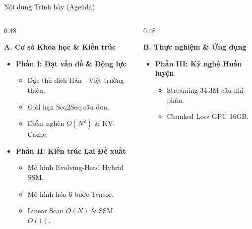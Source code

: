 \documentclass[aspectratio=169, 10pt]{beamer}
\begin{document}
\begin{frame}{Nội dung Trình bày (Agenda)}
  \begin{columns}[t]
    \begin{column}{0.48\textwidth}
      \begin{block}{\textbf{A. Cơ sở Khoa học \& Kiến trúc}}
        \footnotesize
        \begin{itemize}
          \setlength{\itemsep}{0.15cm}
          \item \textbf{Phần I: Đặt vấn đề \& Động lực}
            \begin{itemize}
              \footnotesize
              \item Đặc thù dịch Hán - Việt trường thiên.
              \item Giới hạn Seq2Seq câu đơn.
              \item Điểm nghẽn $O(N^2)$ \& KV-Cache.
            \end{itemize}
          \item \textbf{Phần II: Kiến trúc Lai Đề xuất}
            \begin{itemize}
              \footnotesize
              \item Mô hình Evolving-Head Hybrid SSM.
              \item Mô hình hóa 6 bước Tensor.
              \item Linear Scan $O(N)$ \& SSM $O(1)$.
            \end{itemize}
        \end{itemize}
      \end{block}
    \end{column}
    \begin{column}{0.48\textwidth}
      \begin{block}{\textbf{B. Thực nghiệm \& Ứng dụng}}
        \footnotesize
        \begin{itemize}
          \setlength{\itemsep}{0.15cm}
          \item \textbf{Phần III: Kỹ nghệ Huấn luyện}
            \begin{itemize}
              \footnotesize
              \item Streaming 34.3M câu nhị phân.
              \item Chunked Loss GPU 16GB.
            \end{itemize}

\end{itemize}
\end{block}
\end{column}
\end{columns}
\end{frame}
\end{document}
